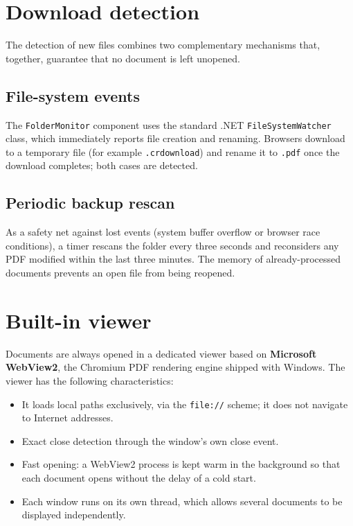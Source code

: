\documentclass[11pt,a4paper]{article}
\begin{document}
\section{Download detection}
The detection of new files combines two complementary mechanisms that, together,
guarantee that no document is left unopened.

\subsection{File-system events}
The \texttt{FolderMonitor} component uses the standard .NET
\texttt{FileSystemWatcher} class, which immediately reports file creation and
renaming. Browsers download to a temporary file (for example \texttt{.crdownload})
and rename it to \texttt{.pdf} once the download completes; both cases are
detected.

\subsection{Periodic backup rescan}
As a safety net against lost events (system buffer overflow or browser race
conditions), a timer rescans the folder every three seconds and reconsiders any
PDF modified within the last three minutes. The memory of already-processed
documents prevents an open file from being reopened.

\section{Built-in viewer}
Documents are always opened in a dedicated viewer based on \textbf{Microsoft
WebView2}, the Chromium PDF rendering engine shipped with Windows. The viewer has
the following characteristics:

\begin{itemize}[leftmargin=1.4em,itemsep=2pt]
  \item It loads local paths exclusively, via the \texttt{file://} scheme; it does
        not navigate to Internet addresses.
  \item Exact close detection through the window's own close event.
  \item Fast opening: a WebView2 process is kept warm in the background so that
        each document opens without the delay of a cold start.
  \item Each window runs on its own thread, which allows several documents to be
        displayed independently.
\end{itemize}
\end{document}
